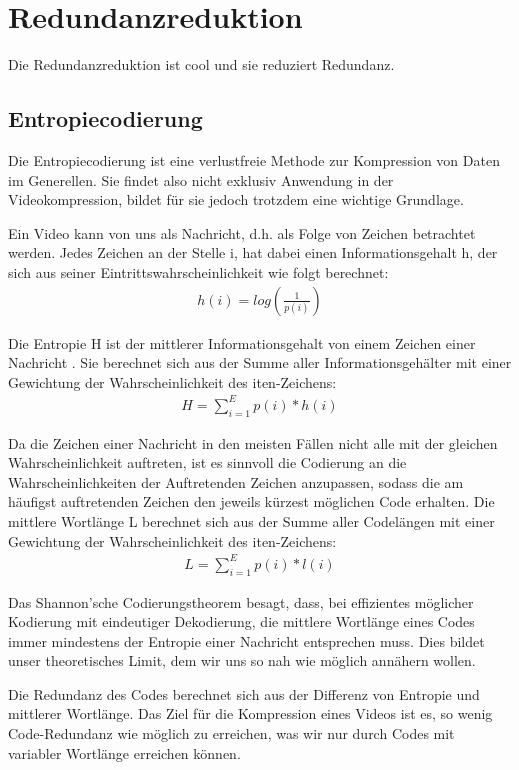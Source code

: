 \chapter{Redundanzreduktion}
\label{kap:Redundanzreduktion}

Die Redundanzreduktion ist cool und sie reduziert Redundanz.

\section{Entropiecodierung}

Die Entropiecodierung ist eine verlustfreie Methode zur Kompression von Daten im Generellen. Sie findet also nicht exklusiv Anwendung in der Videokompression, bildet für sie jedoch trotzdem eine wichtige Grundlage.

Ein Video kann von uns als Nachricht, d.h. als Folge von Zeichen betrachtet werden. Jedes Zeichen an der Stelle i, hat dabei einen Informationsgehalt h, der sich aus seiner Eintrittswahrscheinlichkeit wie folgt berechnet:
\begin{align*}
h(i) = log(\frac{1}{p(i)})
\end{align*}

Die Entropie H ist der mittlerer Informationsgehalt von einem Zeichen einer Nachricht .
Sie berechnet sich aus der Summe aller Informationsgehälter mit einer Gewichtung der Wahrscheinlichkeit des iten-Zeichens:
\begin{align*}
H = \sum_{i=1}^E p(i) * h(i)
\end{align*}

Da die Zeichen einer Nachricht in den meisten Fällen nicht alle mit der gleichen Wahrscheinlichkeit auftreten, ist es sinnvoll die Codierung an die Wahrscheinlichkeiten der Auftretenden Zeichen anzupassen, sodass die am häufigst auftretenden Zeichen den jeweils kürzest möglichen Code erhalten.
Die mittlere Wortlänge L berechnet sich aus der Summe aller Codelängen mit einer Gewichtung der Wahrscheinlichkeit des iten-Zeichens: 
\begin{align*}
L = \sum_{i=1}^E p(i) * l(i)
\end{align*}


Das Shannon'sche Codierungstheorem besagt, dass, bei effizientes möglicher Kodierung mit eindeutiger Dekodierung, die mittlere Wortlänge eines Codes immer mindestens der Entropie einer Nachricht entsprechen muss. Dies bildet unser theoretisches Limit, dem wir uns so nah wie möglich annähern wollen.

Die Redundanz des Codes berechnet sich aus der Differenz von Entropie und mittlerer Wortlänge. Das Ziel für die Kompression eines Videos ist es, so wenig Code-Redundanz wie möglich zu erreichen, was wir nur durch Codes mit variabler Wortlänge erreichen können.


